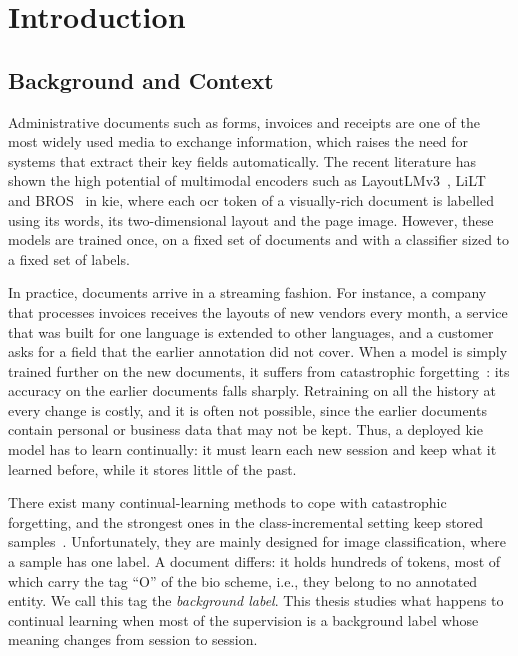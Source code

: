 \chapter{Introduction}
\label{ch:intro}

\section{Background and Context}
\label{sec:c1-s1}

Administrative documents such as forms, invoices and receipts are one of the most widely
used media to exchange information, which raises the need for systems that extract their
key fields automatically. The recent literature has shown the high potential of multimodal
encoders such as LayoutLMv3~\citep{huang2022layoutlmv3}, LiLT~\citep{wang2022lilt} and
BROS~\citep{hong2022bros} in \gls{kie}, where each \gls{ocr} token of a visually-rich
document is labelled using its words, its two-dimensional layout and the page image.
However, these models are trained once, on a fixed set of documents and with a classifier
sized to a fixed set of labels.

In practice, documents arrive in a streaming fashion. For instance, a company that
processes invoices receives the layouts of new vendors every month, a service that was
built for one language is extended to other languages, and a customer asks for a field
that the earlier annotation did not cover. When a model is simply trained further on the
new documents, it suffers from catastrophic forgetting~\citep{mccloskey1989catastrophic}:
its accuracy on the earlier documents falls sharply. Retraining on all the history at every
change is costly, and it is often not possible, since the earlier documents contain
personal or business data that may not be kept. Thus, a deployed \gls{kie} model has to
learn continually: it must learn each new session and keep what it learned before, while it
stores little of the past.

There exist many continual-learning methods to cope with catastrophic forgetting, and the
strongest ones in the class-incremental setting keep stored
samples~\citep{masana2022class,wang2024survey}. Unfortunately, they are mainly designed for
image classification, where a sample has one label. A document differs: it holds hundreds
of tokens, most of which carry the tag ``O'' of the \gls{bio} scheme, i.e., they belong to
no annotated entity. We call this tag the \emph{background label}. This thesis studies what
happens to continual learning when most of the supervision is a background label whose
meaning changes from session to session.

